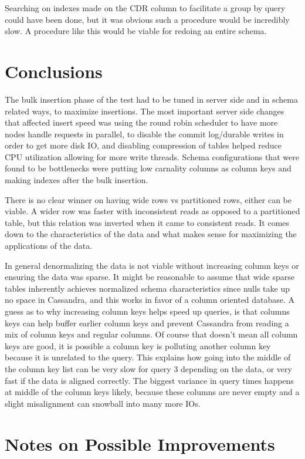 \documentclass[letterpaper]{article}
\begin{document}
Searching on indexes made on the CDR column to facilitate a group by query could have been done, but
it was obvious such a procedure would be incredibly slow. A procedure like this would be viable for 
redoing an entire schema.

\section{Conclusions}

The bulk insertion phase of the test had to be tuned in server side and in schema related ways, to maximize
insertions.
The most important server side changes that affected insert speed was using the round
robin scheduler to have more nodes handle requests in parallel, to disable
the commit log/durable writes in order to get more disk IO, and disabling compression of tables helped
reduce CPU utilization allowing for more write threads. Schema configurations that were found to be
bottlenecks were putting low carnality columns as column keys and making indexes after the bulk 
insertion.

There is no clear winner on having wide rows vs partitioned rows, either can be viable. A wider row
was faster with inconsistent reads as opposed to a partitioned table, but this relation was inverted when
it came to consistent reads. It comes down to the characteristics of the data and what makes
sense for maximizing the applications of the data.

In general denormalizing the data is not viable without increasing column keys or ensuring the data
was sparse. It might be reasonable to assume that wide sparse tables inherently achieves normalized
schema characteristics since nulls take up no space in Cassandra, and this works in favor of a column oriented database. 
A guess as to why increasing column keys helps speed up queries, is that columns keys can help buffer
earlier column keys and prevent Cassandra from reading a mix of column keys and regular columns.
Of course that doesn't mean all column keys are good, it is possible a column key is polluting
another column key because it is unrelated to the query. This explains how going into the middle of
the column key list can be very slow for query 3 depending on the data, or very fast if the data
is aligned correctly. The biggest variance in query times happens at middle of the
column keys likely, because these columns are never empty and a slight misalignment can snowball
into many more IOs. 

\section{Notes on Possible Improvements}
\end{document}
